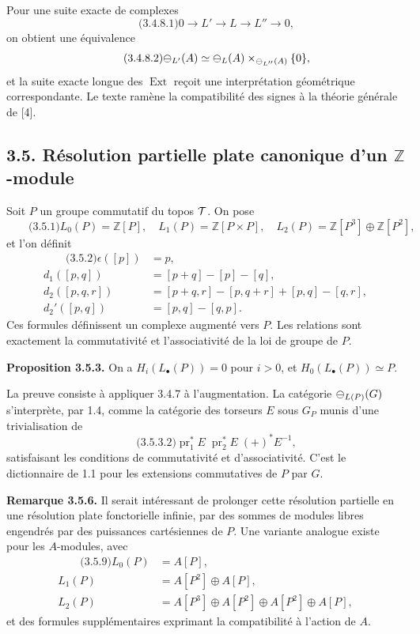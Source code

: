 \documentclass[11pt]{article}
\providecommand{\Z}{\mathbb Z}
\providecommand{\pr}{\operatorname{pr}}
\providecommand{\Ext}{\operatorname{Ext}}
\begin{document}
Pour une suite exacte de complexes
\begin{equation}\qquad\text{(3.4.8.1)}
  0\to L'\to L\to L''\to0,
\end{equation}
on obtient une équivalence
\begin{equation}\qquad\text{(3.4.8.2)}
  \mathcal\Psi_{L'}(A)\simeq \mathcal\Psi_L(A)\times_{\mathcal\Psi_{L''}(A)}\{0\},
\end{equation}
et la suite exacte longue des \(\Ext\) re\c coit une interpr\'etation g\'eom\'etrique correspondante.  Le texte ram\`ene la compatibilit\'e des signes \`a la th\'eorie g\'en\'erale de [4].

\subsection*{3.5. R\'esolution partielle plate canonique d'un \(\Z\)-module}
Soit \(P\) un groupe commutatif du topos \(\mathcal T\).  On pose
\begin{equation}\qquad\text{(3.5.1)}
  L_0(P)=\Z[P],\quad L_1(P)=\Z[P\times P],\quad
  L_2(P)=\Z[P^3]\oplus\Z[P^2],
\end{equation}
et l'on d\'efinit
\begin{align}\qquad\text{(3.5.2)}
 \epsilon([p])&=p,\\
 d_1([p,q])&=[p+q]-[p]-[q],\\
 d_2([p,q,r])&=[p+q,r]-[p,q+r]+[p,q]-[q,r],\\
 d_2'([p,q])&=[p,q]-[q,p].
\end{align}
Ces formules d\'efinissent un complexe augment\'e vers \(P\).  Les relations sont exactement la commutativit\'e et l'associativit\'e de la loi de groupe de \(P\).

\textbf{Proposition 3.5.3.}  On a \(H_i(L_\bullet(P))=0\) pour \(i>0\), et \(H_0(L_\bullet(P))\simeq P\).

La preuve consiste \`a appliquer 3.4.7 \`a l'augmentation.  La cat\'egorie \(\mathcal\Psi_{L(P)}(G)\) s'interpr\`ete, par 1.4, comme la cat\'egorie des torseurs \(E\) sous \(G_P\) munis d'une trivialisation de
\begin{equation}\qquad\text{(3.5.3.2)}
  \pr_1^*E\;\pr_2^*E\;(+)^*E^{-1},
\end{equation}
satisfaisant les conditions de commutativit\'e et d'associativit\'e.  C'est le dictionnaire de 1.1 pour les extensions commutatives de \(P\) par \(G\).

\textbf{Remarque 3.5.6.}  Il serait int\'eressant de prolonger cette r\'esolution partielle en une r\'esolution plate fonctorielle infinie, par des sommes de modules libres engendr\'es par des puissances cart\'esiennes de \(P\).  Une variante analogue existe pour les \(A\)-modules, avec
\begin{align}\qquad\text{(3.5.9)}
L_0(P)&=A[P],\\
L_1(P)&=A[P^2]\oplus A[P],\\
L_2(P)&=A[P^3]\oplus A[P^2]\oplus A[P^2]\oplus A[P],
\end{align}
et des formules suppl\'ementaires exprimant la compatibilit\'e \`a l'action de \(A\).
\end{document}
